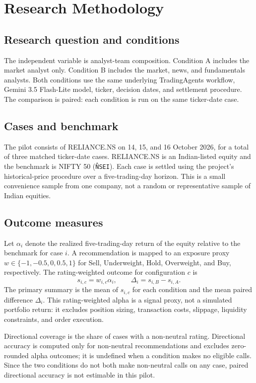 \documentclass[10pt]{article}
\begin{document}
\section{Research Methodology}
\subsection{Research question and conditions}
The independent variable is analyst-team composition. Condition A includes the market analyst only. Condition B includes the market, news, and fundamentals analysts. Both conditions use the same underlying TradingAgents workflow, Gemini 3.5 Flash-Lite model, ticker, decision dates, and settlement procedure. The comparison is paired: each condition is run on the same ticker-date case.

\subsection{Cases and benchmark}
The pilot consists of RELIANCE.NS on 14, 15, and 16 October 2026, for a total of three matched ticker-date cases. RELIANCE.NS is an Indian-listed equity and the benchmark is NIFTY 50 (\texttt{\^NSEI}). Each case is settled using the project's historical-price procedure over a five-trading-day horizon. This is a small convenience sample from one company, not a random or representative sample of Indian equities.

\subsection{Outcome measures}
Let $\alpha_i$ denote the realized five-trading-day return of the equity relative to the benchmark for case $i$. A recommendation is mapped to an exposure proxy $w\in\{-1,-0.5,0,0.5,1\}$ for Sell, Underweight, Hold, Overweight, and Buy, respectively. The rating-weighted outcome for configuration $c$ is
\[
s_{i,c}=w_{i,c}\alpha_i,
\qquad
\Delta_i=s_{i,B}-s_{i,A}.
\]
The primary summary is the mean of $s_{i,c}$ for each condition and the mean paired difference $\Delta_i$. This rating-weighted alpha is a signal proxy, not a simulated portfolio return: it excludes position sizing, transaction costs, slippage, liquidity constraints, and order execution.

Directional coverage is the share of cases with a non-neutral rating. Directional accuracy is computed only for non-neutral recommendations and excludes zero-rounded alpha outcomes; it is undefined when a condition makes no eligible calls. Since the two conditions do not both make non-neutral calls on any case, paired directional accuracy is not estimable in this pilot.
\end{document}
